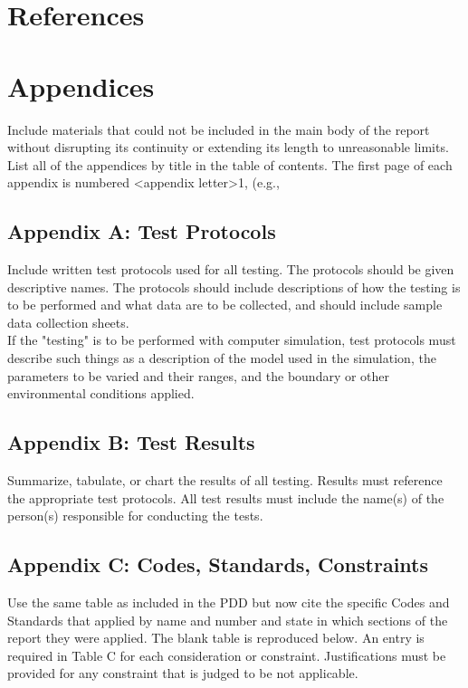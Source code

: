 \documentclass[12pt,a4paper]{report}
\begin{document}
\section{References}
\begingroup
   \def\chapter*#1{}
   
	
\endgroup	

 

\section{Appendices}
Include materials that could not be included in the main body of the report without disrupting its continuity or extending its length to unreasonable limits.  List all of the appendices by title in the table of contents.  
%
The first page of each appendix is numbered <appendix letter>1, (e.g., 
%
\subsection{Appendix A: Test Protocols}
Include written test protocols used for all testing.  The protocols should be given descriptive names. The protocols should include descriptions of how the testing is to be performed and what data are to be collected, and should include sample data collection sheets.\\
If the "testing" is to be performed with computer simulation, test protocols must describe such things as a description of the model used in the simulation, the parameters to be varied and their ranges, and the boundary or other environmental conditions applied.\\
%
%
\subsection{Appendix B: Test Results}
Summarize, tabulate, or chart the results of all testing. Results must reference the appropriate test protocols.  All test results must include the name(s) of the person(s) responsible for conducting the tests.\\
%
\subsection{Appendix C: Codes, Standards, Constraints}
Use the same table as included in the PDD but now cite the specific Codes and Standards that applied by name and number and state in which sections of the report they were applied.  The blank table is reproduced below.  An entry is required in Table C for each consideration or constraint.  Justifications must be provided for any constraint that is judged to be not applicable.\\
%
\end{document}
